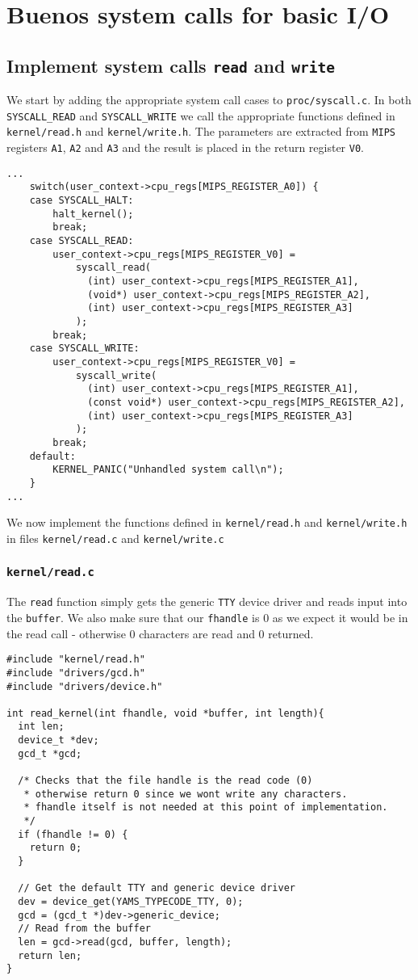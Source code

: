 \documentclass[a4paper,12pt]{article}
\begin{document}
\section{Buenos system calls for basic I/O}
\subsection{Implement system calls \texttt{read} and \texttt{write}}
We start by adding the appropriate system call cases to \texttt{proc/syscall.c}. In both \texttt{SYSCALL\_READ} and \texttt{SYSCALL\_WRITE} we call the appropriate functions defined in \texttt{kernel/read.h} and \texttt{kernel/write.h}. The parameters are extracted from \texttt{MIPS} registers \texttt{A1}, \texttt{A2} and \texttt{A3} and the result is placed in the return register \texttt{V0}.
\begin{lstlisting}
...
    switch(user_context->cpu_regs[MIPS_REGISTER_A0]) {
    case SYSCALL_HALT:
        halt_kernel();
        break;
    case SYSCALL_READ:
        user_context->cpu_regs[MIPS_REGISTER_V0] =
            syscall_read(
              (int) user_context->cpu_regs[MIPS_REGISTER_A1],
              (void*) user_context->cpu_regs[MIPS_REGISTER_A2],
              (int) user_context->cpu_regs[MIPS_REGISTER_A3]
            );
        break;
    case SYSCALL_WRITE:
        user_context->cpu_regs[MIPS_REGISTER_V0] =
            syscall_write(
              (int) user_context->cpu_regs[MIPS_REGISTER_A1],
              (const void*) user_context->cpu_regs[MIPS_REGISTER_A2],
              (int) user_context->cpu_regs[MIPS_REGISTER_A3]
            );
        break;
    default: 
        KERNEL_PANIC("Unhandled system call\n");
    }
...
\end{lstlisting}
We now implement the functions defined in \texttt{kernel/read.h} and \texttt{kernel/write.h} in files \texttt{kernel/read.c} and \texttt{kernel/write.c}

\subsubsection{\texttt{kernel/read.c}}
The \texttt{read} function simply gets the generic \texttt{TTY} device driver and reads input into the \texttt{buffer}. We also make sure that our \texttt{fhandle} is 0 as we expect it would be in the read call - otherwise 0 characters are read and 0 returned.

\begin{lstlisting}
#include "kernel/read.h"
#include "drivers/gcd.h"
#include "drivers/device.h"

int read_kernel(int fhandle, void *buffer, int length){
  int len;
  device_t *dev;
  gcd_t *gcd;

  /* Checks that the file handle is the read code (0)
   * otherwise return 0 since we wont write any characters.
   * fhandle itself is not needed at this point of implementation.
   */  
  if (fhandle != 0) {
    return 0;
  }

  // Get the default TTY and generic device driver
  dev = device_get(YAMS_TYPECODE_TTY, 0);
  gcd = (gcd_t *)dev->generic_device;
  // Read from the buffer
  len = gcd->read(gcd, buffer, length);
  return len;
}
\end{lstlisting}
\end{document}
